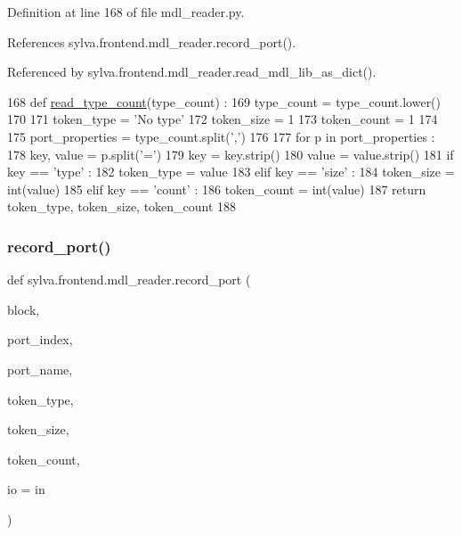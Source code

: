 Definition at line 168 of file mdl\+\_\+reader.\+py.



References sylva.\+frontend.\+mdl\+\_\+reader.\+record\+\_\+port().



Referenced by sylva.\+frontend.\+mdl\+\_\+reader.\+read\+\_\+mdl\+\_\+lib\+\_\+as\+\_\+dict().


\begin{DoxyCode}
168   \textcolor{keyword}{def }\hyperlink{namespacesylva_1_1frontend_1_1mdl__reader_ab497eed79d6bd7ce335dafa24e638470}{read\_type\_count}(type\_count) :
169     type\_count = type\_count.lower()
170 
171     token\_type = \textcolor{stringliteral}{'No type'}
172     token\_size = 1
173     token\_count = 1
174 
175     port\_properties = type\_count.split(\textcolor{stringliteral}{','})
176 
177     \textcolor{keywordflow}{for} p \textcolor{keywordflow}{in} port\_properties :
178       key, value = p.split(\textcolor{stringliteral}{'='})
179       key = key.strip()
180       value = value.strip()
181       \textcolor{keywordflow}{if} key == \textcolor{stringliteral}{'type'} :
182         token\_type = value
183       \textcolor{keywordflow}{elif} key == \textcolor{stringliteral}{'size'} :
184         token\_size = int(value)
185       \textcolor{keywordflow}{elif} key == \textcolor{stringliteral}{'count'} :
186         token\_count = int(value)
187     \textcolor{keywordflow}{return} token\_type, token\_size, token\_count
188 
\end{DoxyCode}
\mbox{\label{namespacesylva_1_1frontend_1_1mdl__reader_a5c3d81eb45232a9875a247ce76c4cdc9}} 
\subsubsection{\texorpdfstring{record\+\_\+port()}{record\_port()}}
{\footnotesize\ttfamily def sylva.\+frontend.\+mdl\+\_\+reader.\+record\+\_\+port (\begin{DoxyParamCaption}\item[{}]{block,  }\item[{}]{port\+\_\+index,  }\item[{}]{port\+\_\+name,  }\item[{}]{token\+\_\+type,  }\item[{}]{token\+\_\+size,  }\item[{}]{token\+\_\+count,  }\item[{}]{io = {\ttfamily \textquotesingle{}in\textquotesingle{}} }\end{DoxyParamCaption})}




